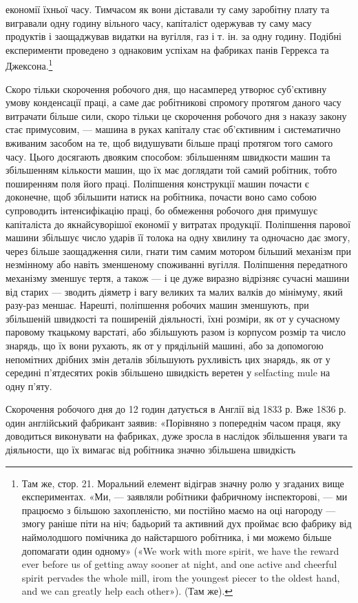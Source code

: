 \parcont{}  %
економії їхньої часу. Тимчасом як вони діставали ту саму заробітну
плату та вигравали одну годину вільного часу, капіталіст
одержував ту саму масу продуктів і заощаджував видатки на
вугілля, газ і т. ін. за одну годину. Подібні експерименти проведено
з однаковим успіхам на фабриках панів Геррекса та
Джексона.\footnote{
Там же, стор. 21. Моральний елемент відіграв значну ролю у
згаданих вище експериментах. «Ми, — заявляли робітники фабричному
інспекторові, — ми працюємо з більшою захопленістю, ми постійно маємо
на оці нагороду — змогу раніше піти на ніч; бадьорий та активний
дух проймає всю фабрику від наймолодшого помічника до найстаршого
робітника, і ми можемо більше допомагати один одному» («We work with
more spirit, we have the reward ever before us of getting away sooner at
night, and one active and cheerful spirit pervades the whole mill, irom the
youngest piecer to the oldest hand, and we can greatly help each other»).
(Там же).
}

Скоро тільки скорочення робочого дня, що насамперед утворює
суб’єктивну умову конденсації праці, а саме дає робітникові
спромогу протягом даного часу витрачати більше сили, скоро
тільки це скорочення робочого дня з наказу закону стає примусовим,
— машина в руках капіталу стає об’єктивним і систематично
вживаним засобом на те, щоб видушувати більше праці
протягом того самого часу. Цього досягають двояким способом:
збільшенням швидкости машин та збільшенням кількости машин,
що їх має доглядати той самий робітник, тобто поширенням поля
його праці. Поліпшення конструкції машин почасти є доконечне,
щоб збільшити натиск на робітника, почасти воно само собою
супроводить інтенсифікацію праці, бо обмеження робочого дня
примушує капіталіста до якнайсуворішої економії у витратах
продукції. Поліпшення парової машини збільшує число ударів
її толока на одну хвилину та одночасно дає змогу, через більше
заощадження сили, гнати тим самим мотором більший механізм
при незмінному або навіть зменшеному споживанні вугілля.
Поліпшення передатного механізму зменшує тертя, а також — і це
дуже виразно відрізняє сучасні машини від старих — зводить
діяметр і вагу великих та малих валків до мінімуму, який разу-раз
меншає. Нарешті, поліпшення робочих машин зменшують,
при збільшеній швидкості та поширеній діяльності, їхні розміри,
як от у сучасному паровому ткацькому варстаті, або збільшують
разом із корпусом розмір та число знарядь, що їх вони рухають,
як от у прядільній машині, або за допомогою непомітних дрібних
змін деталів збільшують рухливість цих знарядь, як от у середині
п’ятдесятих років збільшено швидкість веретен у selfacting mule
на одну п’яту.

Скорочення робочого дня до 12 годин датується в Англії від
1833 р. Вже 1836 р. один англійський фабрикант заявив: «Порівняно
з попереднім часом праця, яку доводиться виконувати на
фабриках, дуже зросла в наслідок збільшення уваги та діяльности,
що їх вимагає від робітника значно збільшена швидкість
\parbreak{}  %
